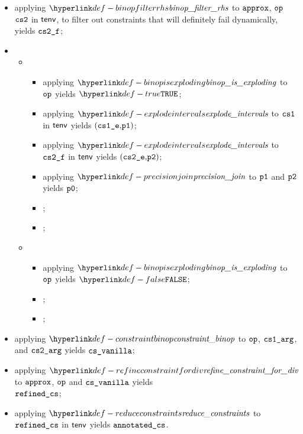 \ProseParagraph
\AllApply
\begin{itemize}
  \item applying $\binopfilterrhs$ to $\texttt{approx}$, $\texttt{op}$ $\texttt{cs2}$ in $\textsf{tenv}$, to filter out constraints that will definitely fail dynamically,
        yields $\texttt{cs2\_f}$\ProseTerminateAs{\CannotUnderapproximate, \CannotOverapproximate};
  \item \OneApplies
  \begin{itemize}
    \item {}
    \begin{itemize}
      \item applying $\binopisexploding$ to $\texttt{op}$ yields $\True$;
      \item applying $\explodeintervals$ to $\texttt{cs1}$ in $\textsf{tenv}$ yields $(\texttt{cs1\_e} \mathbf{,} \texttt{p1})$;
      \item applying $\explodeintervals$ to $\texttt{cs2\_f}$ in $\textsf{tenv}$ yields $(\texttt{cs2\_e} \mathbf{,} \texttt{p2})$;
      \item applying $\precisionjoin$ to $\texttt{p1}$ and $\texttt{p2}$ yields $\texttt{p0}$;
      \item {};
      \item {};
    \end{itemize}

    \item {}
    \begin{itemize}
      \item applying $\binopisexploding$ to $\texttt{op}$ yields $\False$;
      \item \Proseeqdef{$\vp$}{$\PrecisionFull$};
      \item \Proseeqdef{$(\csonearg, \cstwoarg)$}{$(\csone, \cstwof)$};
    \end{itemize}
  \end{itemize}
  \item applying $\constraintbinop$ to $\texttt{op}$, $\texttt{cs1\_arg}$, and $\texttt{cs2\_arg}$ yields $\texttt{cs\_vanilla}$;
  \item applying $\refineconstraintfordiv$ to $\texttt{approx}$, $\texttt{op}$ and $\texttt{cs\_vanilla}$ yields\\
        $\texttt{refined\_cs}$\ProseTerminateAs{\CannotUnderapproximate, \CannotOverapproximate};
  \item applying $\reduceconstraints$ to $\texttt{refined\_cs}$ in $\textsf{tenv}$ yields $\texttt{annotated\_cs}$.
\end{itemize}

